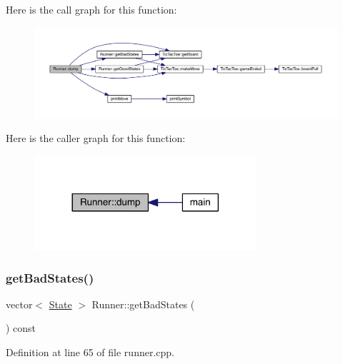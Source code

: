 Here is the call graph for this function\+:\nopagebreak
\begin{figure}[H]
\begin{center}
\leavevmode
\includegraphics[width=350pt]{class_runner_a4cc0bf3493f80516761032d55cc2ffab_cgraph}
\end{center}
\end{figure}
Here is the caller graph for this function\+:\nopagebreak
\begin{figure}[H]
\begin{center}
\leavevmode
\includegraphics[width=233pt]{class_runner_a4cc0bf3493f80516761032d55cc2ffab_icgraph}
\end{center}
\end{figure}
\mbox{\label{class_runner_ae3105a026f21ed05a8c022857cd12617}} 
\subsubsection{\texorpdfstring{get\+Bad\+States()}{getBadStates()}}
{\footnotesize\ttfamily vector$<$ \hyperlink{constants_8h_afd2599a4148deb913a46b4e2eba9e68a}{State} $>$ Runner\+::get\+Bad\+States (\begin{DoxyParamCaption}{ }\end{DoxyParamCaption}) const}



Definition at line 65 of file runner.\+cpp.

